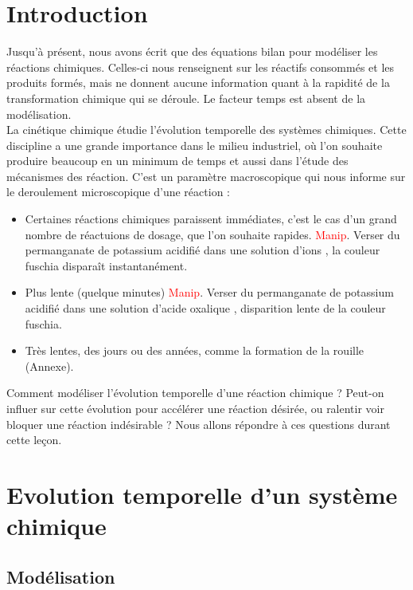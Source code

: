\documentclass{article}
\begin{document}
\section*{Introduction}

Jusqu'à présent, nous avons écrit que des équations bilan pour modéliser les réactions chimiques. Celles-ci nous renseignent sur les réactifs consommés et les produits formés, mais ne donnent aucune information quant à la rapidité de la transformation chimique qui se déroule. Le facteur temps est absent de la modélisation.\\

La cinétique chimique étudie l'évolution temporelle des systèmes chimiques. Cette discipline a une grande importance dans le milieu industriel, où l'on souhaite produire beaucoup en un minimum de temps et aussi dans l'étude des mécanismes des réaction. C'est un paramètre macroscopique qui nous informe sur le deroulement microscopique d'une réaction :\\

\begin{itemize}
    \item Certaines réactions chimiques paraissent immédiates, c'est le cas d'un grand nombre de réactuions de dosage, que l'on souhaite rapides. \textcolor{red}{Manip}. Verser du permanganate de potassium acidifié dans une solution d'ions , la couleur fuschia disparaît instantanément.
    \item Plus lente (quelque minutes) \textcolor{red}{Manip}. Verser du permanganate de potassium acidifié dans une solution d'acide oxalique , disparition lente de la couleur fuschia.
    \item Très lentes, des jours ou des années, comme la formation de la rouille (Annexe).
\end{itemize}

Comment modéliser l'évolution temporelle d'une réaction chimique ? Peut-on influer sur cette évolution pour accélérer une réaction désirée, ou ralentir voir bloquer une réaction indésirable ? Nous allons répondre à ces questions durant cette leçon.\\



\section{Evolution temporelle d'un système chimique}
\subsection{Modélisation}
\end{document}
